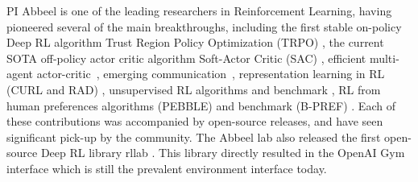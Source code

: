 \documentclass{NSF}
\begin{document}
PI Abbeel is one of the leading researchers in Reinforcement Learning, having pioneered several of the main breakthroughs, including the first stable on-policy Deep RL algorithm Trust Region Policy Optimization (TRPO) \cite{schulman2015trust}, the current SOTA off-policy actor critic algorithm Soft-Actor Critic (SAC) \cite{haarnoja2018soft}, efficient multi-agent actor-critic~\cite{lowe2017multiagent}, emerging communication~\cite{mordatch2017emergence}, representation learning in RL (CURL and RAD) \cite{misha20curl,RAD}, unsupervised RL algorithms and benchmark \cite{URLB}, RL from human preferences algorithms (PEBBLE) \cite{pebble} and benchmark (B-PREF) \cite{lee2021bpref}.
Each of these contributions was accompanied by open-source releases, and have seen significant pick-up by the community.
The Abbeel lab also released the first open-source Deep RL library rllab \cite{duan2016benchmarking}.
This library directly resulted in the OpenAI Gym interface \cite{openaigym} which is still the prevalent environment interface today.


\newpage
\renewcommand\refname{References Cited}


\end{document}
